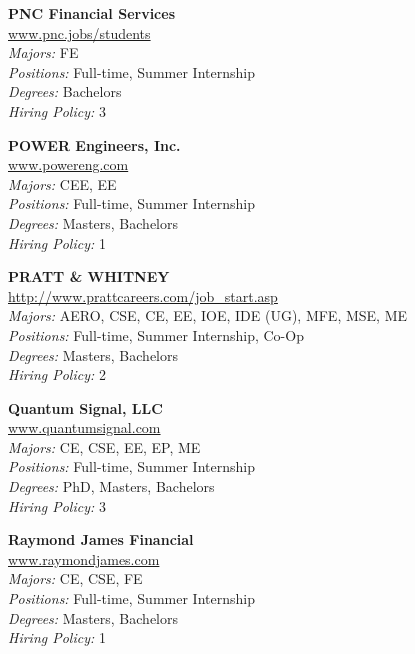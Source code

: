\documentclass[twoside]{article}
\begin{document}
\begin{center}
\begin{multicols}{3}
\begin{minipage}{.9\columnwidth}{\Large\bf PNC Financial Services }\\
	\url{www.pnc.jobs/students}\\
	\emph{Majors:} FE\\
	\emph{Positions:} Full-time, Summer Internship\\
	\emph{Degrees:} Bachelors\\
	\emph{Hiring Policy:} 3\\
\end{minipage}
 
\begin{minipage}{.9\columnwidth}{\Large\bf POWER Engineers, Inc. }\\
	\url{www.powereng.com}\\
	\emph{Majors:} CEE, EE\\
	\emph{Positions:} Full-time, Summer Internship\\
	\emph{Degrees:} Masters, Bachelors\\
	\emph{Hiring Policy:} 1\\
\end{minipage}
 
\begin{minipage}{.9\columnwidth}{\Large\bf PRATT \& WHITNEY }\\
	\url{http://www.prattcareers.com/job_start.asp}\\
	\emph{Majors:} AERO, CSE, CE, EE, IOE, IDE (UG), MFE, MSE, ME\\
	\emph{Positions:} Full-time, Summer Internship, Co-Op\\
	\emph{Degrees:} Masters, Bachelors\\
	\emph{Hiring Policy:} 2\\
\end{minipage}
 
\begin{minipage}{.9\columnwidth}{\Large\bf Quantum Signal, LLC }\\
	\url{www.quantumsignal.com}\\
	\emph{Majors:} CE, CSE, EE, EP, ME\\
	\emph{Positions:} Full-time, Summer Internship\\
	\emph{Degrees:} PhD, Masters, Bachelors\\
	\emph{Hiring Policy:} 3\\
\end{minipage}
 
\begin{minipage}{.9\columnwidth}{\Large\bf Raymond James Financial }\\
	\url{www.raymondjames.com}\\
	\emph{Majors:} CE, CSE, FE\\
	\emph{Positions:} Full-time, Summer Internship\\
	\emph{Degrees:} Masters, Bachelors\\
	\emph{Hiring Policy:} 1\\
\end{minipage}
 

\end{multicols}
\end{center}
\end{document}
